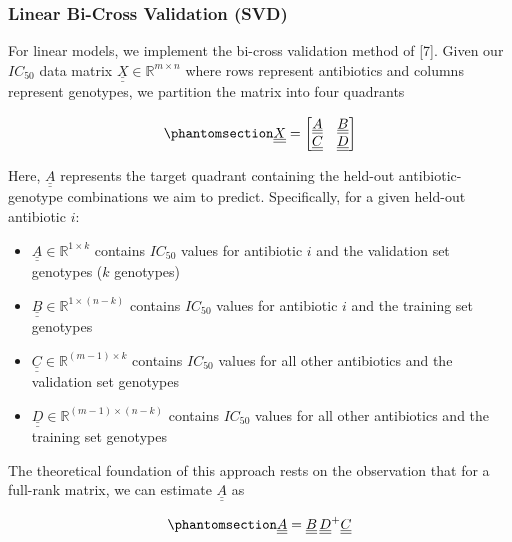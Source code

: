 \documentclass[
]{scrartcl}
\providecommand{\tightlist}{%
  \setlength{\itemsep}{0pt}\setlength{\parskip}{0pt}}
\begin{document}
\begin{refsection}
\subsubsection{Linear Bi-Cross Validation
(SVD)}\label{linear-bi-cross-validation-svd}

For linear models, we implement the bi-cross validation method of
{[}7{]}. Given our \(IC_{50}\) data matrix
\(\underline{\underline{X}} \in \mathbb{R}^{m
\times n}\) where rows represent antibiotics and columns represent
genotypes, we partition the matrix into four quadrants

\begin{equation}\phantomsection\label{eq-crossvalidation-svd}{
\underline{\underline{X}} = 
\begin{bmatrix}
\underline{\underline{A}} & \underline{\underline{B}} \\
\underline{\underline{C}} & \underline{\underline{D}}
\end{bmatrix}
}\end{equation}

Here, \(\underline{\underline{A}}\) represents the target quadrant
containing the held-out antibiotic-genotype combinations we aim to
predict. Specifically, for a given held-out antibiotic \(i\):

\begin{itemize}
\tightlist
\item
  \(\underline{\underline{A}} \in \mathbb{R}^{1 \times k}\) contains
  \(IC_{50}\) values for antibiotic \(i\) and the validation set
  genotypes (\(k\) genotypes)
\item
  \(\underline{\underline{B}} \in \mathbb{R}^{1 \times (n-k)}\) contains
  \(IC_{50}\) values for antibiotic \(i\) and the training set genotypes
\item
  \(\underline{\underline{C}} \in \mathbb{R}^{(m-1) \times k}\) contains
  \(IC_{50}\) values for all other antibiotics and the validation set
  genotypes
\item
  \(\underline{\underline{D}} \in \mathbb{R}^{(m-1) \times (n-k)}\)
  contains \(IC_{50}\) values for all other antibiotics and the training
  set genotypes
\end{itemize}

The theoretical foundation of this approach rests on the observation
that for a full-rank matrix, we can estimate
\(\underline{\underline{A}}\) as

\begin{equation}\phantomsection\label{eq-crossvalidation-svd-estimate}{
\underline{\underline{A}} = 
\underline{\underline{B}}\, \underline{\underline{D}}^+ \underline{\underline{C}}
}\end{equation}


\end{refsection}
\end{document}
